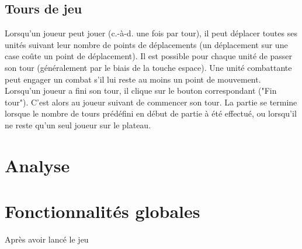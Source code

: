 \documentclass[a4paper]{article}
\begin{document}
\subsection{Tours de jeu}
Lorsqu’un joueur peut jouer (c.-à-d. une fois par tour), il peut déplacer toutes ses unités suivant leur nombre de points de déplacements (un déplacement sur une case coûte un point de déplacement). Il est possible pour chaque unité de passer son tour (généralement par le biais de la touche espace). Une unité combattante peut engager un combat s’il lui reste au moins un point de mouvement. Lorsqu’un joueur a fini son tour, il clique sur le bouton correspondant ("Fin tour"). C’est alors au joueur suivant de commencer son tour. La partie se termine lorsque le nombre de tours prédéfini en début de partie à été effectué, ou lorsqu’il ne reste qu’un seul joueur sur le plateau.

\section{Analyse}
\section{Fonctionnalités globales}
Après avoir lancé le jeu
\end{document}
